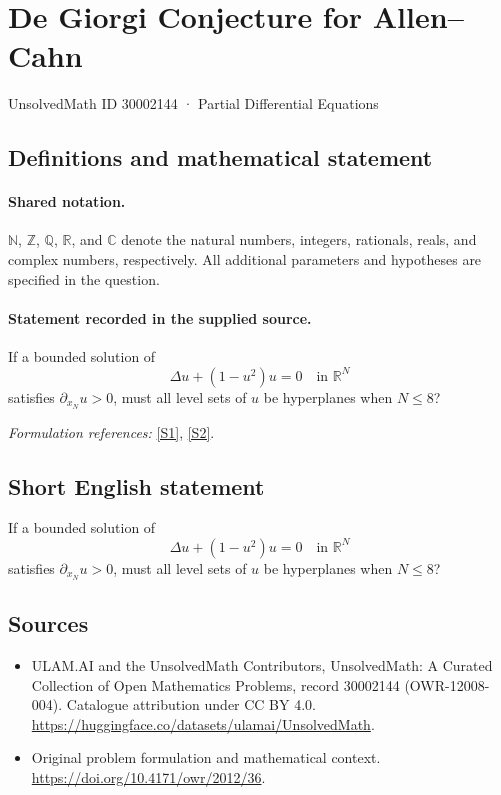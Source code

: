 \documentclass[11pt]{article}
\newcommand{\sref}[2]{\hyperlink{source:#1:#2}{[S#2]}}
\begin{document}
\setcounter{section}{30002143}
\section{De Giorgi Conjecture for Allen–Cahn}\label{30002144}
{\small UnsolvedMath ID 30002144 · Partial Differential Equations}
\subsection{Definitions and mathematical statement}

\paragraph{Shared notation.}$\mathbb N$, $\mathbb Z$, $\mathbb Q$, $\mathbb R$, and $\mathbb C$ denote the natural numbers, integers, rationals, reals, and complex numbers, respectively. All additional parameters and hypotheses are specified in the question.


\paragraph{Statement recorded in the supplied source.}
If a bounded solution of
$$\Delta u+(1-u^2)u=0\quad\text{in }\mathbb R^N$$
satisfies $\partial_{x_N}u>0$, must all level sets of $u$ be hyperplanes when $N\leq8$?
\par\smallskip\textit{Formulation references:} \sref{30002144}{1}, \sref{30002144}{2}.
\subsection{Short English statement}
If a bounded solution of
$$\Delta u+(1-u^2)u=0\quad\text{in }\mathbb R^N$$
satisfies $\partial_{x_N}u>0$, must all level sets of $u$ be hyperplanes when $N\leq8$?
\subsection{Sources}
\begin{itemize}
\item[\hypertarget{source:30002144:1}{S1}] ULAM.AI and the UnsolvedMath Contributors, UnsolvedMath: A Curated Collection of Open Mathematics Problems, record 30002144 (OWR-12008-004). Catalogue attribution under CC BY 4.0.
\url{https://huggingface.co/datasets/ulamai/UnsolvedMath}.
\item[\hypertarget{source:30002144:2}{S2}] Original problem formulation and mathematical context.
\url{https://doi.org/10.4171/owr/2012/36}.
\end{itemize}
\label{end:30002144}
\end{document}
